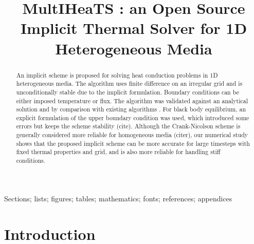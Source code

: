 \documentclass[]{interact}
\theoremstyle{plain}%
\theoremstyle{definition}
\theoremstyle{remark}
\begin{document}

\title{MultIHeaTS : an Open Source Implicit Thermal Solver for 1D Heterogeneous Media}

\author{
}





\maketitle

\begin{abstract}
An implicit scheme is proposed for solving heat conduction problems in 1D  heterogeneous media.
The algorithm uses finite difference on an irregular grid and is unconditionally stable due to the implicit formulation.
Boundary conditions can be either imposed temperature or flux. 
The algorithm was validated against an analytical solution and by comparison with existing algorithms \cite{Spencer1989, Schorghofer2010}.
For black body equilibrium, an explicit formulation of the upper boundary condition was used, which introduced some errors but keeps the scheme stability (cite).
Although the Crank-Nicolson \cite{Crank} scheme is generally considered more reliable for homogeneous media (citer), our numerical study shows that the proposed implicit scheme can be more accurate for large timesteps with fixed thermal properties and grid, and is also more reliable for handling stiff conditions.
\end{abstract}

\begin{keywords}
Sections; lists; figures; tables; mathematics; fonts; references; appendices
\end{keywords}


\section{Introduction}
\end{document}
